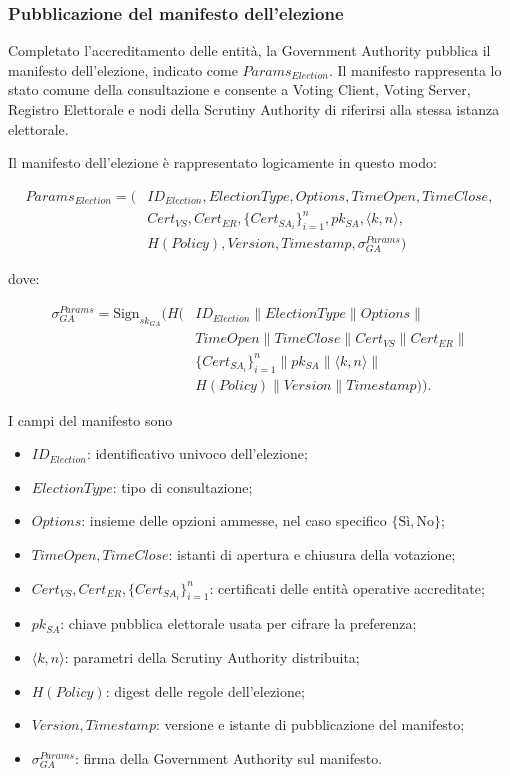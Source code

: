 \documentclass[a4paper,12pt]{article}
\begin{document}
\subsubsection{Pubblicazione del manifesto dell'elezione}

Completato l'accreditamento delle entit\`a, la Government Authority pubblica il manifesto dell'elezione, indicato come \(Params_{Election}\). 
Il manifesto rappresenta lo stato comune della consultazione e consente a Voting Client, Voting Server, Registro Elettorale e nodi della Scrutiny Authority di riferirsi alla stessa istanza elettorale.

Il manifesto dell'elezione è rappresentato logicamente in questo modo:

\[
\begin{aligned}
	Params_{Election} = (&ID_{Election}, ElectionType, Options, TimeOpen, TimeClose,\\
	&Cert_{VS}, Cert_{ER}, \{Cert_{SA_i}\}_{i=1}^{n}, pk_{SA}, \langle k,n\rangle,\\
	&H(Policy), Version, Timestamp, \sigma_{GA}^{Params})
\end{aligned}
\]

dove:

\[
\begin{aligned}
	\sigma_{GA}^{Params} =
	\text{Sign}_{sk_{GA}}\Big(H(&ID_{Election} \parallel ElectionType
	\parallel Options \parallel {}\\
	&TimeOpen \parallel TimeClose \parallel Cert_{VS} \parallel Cert_{ER} \parallel {}\\
	&\{Cert_{SA_i}\}_{i=1}^{n} \parallel pk_{SA} \parallel \langle k,n\rangle \parallel {}\\
	&H(Policy) \parallel Version \parallel Timestamp)\Big).
\end{aligned}
\]

I campi del manifesto sono

\begin{itemize}
	\item \(ID_{Election}\): identificativo univoco dell'elezione;
	\item \(ElectionType\): tipo di consultazione;
	\item \(Options\): insieme delle opzioni ammesse, nel caso specifico \(\{\text{S\`i}, \text{No}\}\);
	\item \(TimeOpen, TimeClose\): istanti di apertura e chiusura della votazione;
	\item \(Cert_{VS}, Cert_{ER}, \{Cert_{SA_i}\}_{i=1}^{n}\): certificati delle entit\`a operative accreditate;
	\item \(pk_{SA}\): chiave pubblica elettorale usata per cifrare la preferenza;
	\item \(\langle k,n\rangle\): parametri della Scrutiny Authority distribuita;
	\item \(H(Policy)\): digest delle regole dell'elezione;
	\item \(Version, Timestamp\): versione e istante di pubblicazione del manifesto;
	\item \(\sigma_{GA}^{Params}\): firma della Government Authority sul manifesto.
\end{itemize}
\end{document}
